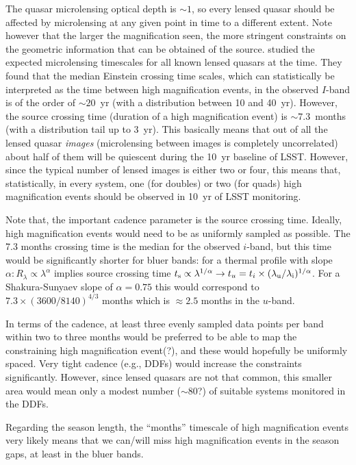 The quasar microlensing optical depth is $\sim1$, so every lensed quasar should 
be affected by microlensing at any given point in time to a different extent. 
Note however that the larger the magnification seen, the more stringent 
constraints on the geometric information that can be obtained of the source. 
\citet{MosqueraandKochanek2011} studied the expected microlensing 
timescales for all known lensed quasars at the time. They found that the median 
Einstein crossing time scales, which can statistically be interpreted as the 
time between high magnification events, in the observed $I$-band is of the order 
of $\sim20$~yr (with a distribution between 10 and 40~yr). However, the source 
crossing time (duration of a high magnification event) is $\sim7.3$~months (with 
a distribution tail up to 3~yr). This basically means that out of all the lensed 
quasar {\em images} (microlensing between images is completely uncorrelated) 
about half of them will be quiescent during the 10~yr baseline of LSST. However, 
since the typical number of lensed images is either two or four, this means 
that, statistically, in every system, one (for doubles) or two (for quads) high 
magnification events should be observed in 10~yr of LSST monitoring. 

Note that, the important cadence parameter is the source crossing time. Ideally, 
high magnification events would need to be as uniformly sampled as possible. The 
7.3 months crossing time is the median for the observed $i$-band, but this time 
would be significantly shorter for bluer bands: for a thermal profile with slope 
$\alpha: R_\lambda \propto \lambda^\alpha$ implies source crossing time $t_{\rm 
s} \propto \lambda^{1/\alpha} \rightarrow t_u=t_i \times (\lambda_{\rm u} / 
\lambda_{\rm i})^{1/\alpha}$. For a Shakura-Sunyaev slope of $\alpha=0.75$ this 
would correspond to $7.3 \times (3600/8140)^{4/3}$ months which is $\approx 2.5$ 
months in the $u$-band.


In terms of the cadence, at least three evenly sampled data points per band 
within two to three months would be preferred to be able to map the constraining 
high magnification event(?), and these would hopefully be uniformly spaced. Very 
tight cadence (e.g., DDFs) would increase the constraints significantly. 
However, since lensed quasars are not that common, this smaller area would mean 
only a modest number ($\sim80$?) of suitable systems monitored in the DDFs.

Regarding the season length, the ``months'' timescale of high
magnification events very likely means that we can/will miss high
magnification events in the season gaps, at least in the bluer bands.

